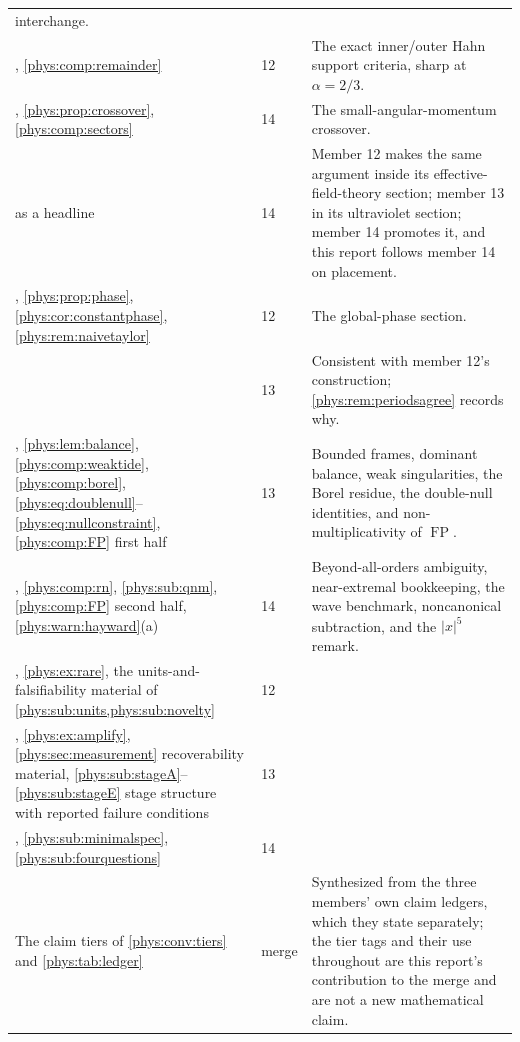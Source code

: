 \documentclass[11pt,letterpaper]{article}
\numberwithin{equation}{section}
\theoremstyle{definition}
\theoremstyle{remark}
\DeclareMathOperator{\FP}{FP}
\newcommand{\abs}[1]{\lvert#1\rvert}
\begin{document}
\begin{longtable}{@{}L{0.30\textwidth}L{0.11\textwidth}L{0.52\textwidth}@{}}
interchange. \\
\addlinespace
{}, \cref{phys:comp:remainder} & 12 & The exact
inner/outer Hahn support criteria, sharp at $\alpha=2/3$. \\
\addlinespace
{}, \cref{phys:prop:crossover},
\cref{phys:comp:sectors} & 14 & The small-angular-momentum crossover. \\
\addlinespace
{} as a headline & 14 & Member 12 makes the same argument
inside its effective-field-theory section; member 13 in its
ultraviolet section; member 14 promotes it, and this report follows member 14
on placement. \\
\addlinespace
{}, \cref{phys:prop:phase},
\cref{phys:cor:constantphase}, \cref{phys:rem:naivetaylor} & 12 &
The global-phase section. \\
\addlinespace
{} & 13 & Consistent with member 12's construction;
\cref{phys:rem:periodsagree} records why. \\
\addlinespace
{}, \cref{phys:lem:balance},
\cref{phys:comp:weaktide}, \cref{phys:comp:borel},
\eqref{phys:eq:doublenull}--\eqref{phys:eq:nullconstraint},
\cref{phys:comp:FP} first half & 13 & Bounded frames, dominant balance, weak
singularities, the Borel residue, the double-null identities, and
non-multiplicativity of $\FP$. \\
\addlinespace
{}, \cref{phys:comp:rn},
\cref{phys:sub:qnm}, \cref{phys:comp:FP} second half,
\cref{phys:warn:hayward}(a) & 14 & Beyond-all-orders ambiguity, near-extremal
bookkeeping, the wave benchmark, noncanonical subtraction, and the
$\abs x^{5}$ remark. \\
\addlinespace
{}, \cref{phys:ex:rare}, the units-and-falsifiability
material of \cref{phys:sub:units,phys:sub:novelty} & 12 & \\
\addlinespace
{}, \cref{phys:ex:amplify},
\cref{phys:sec:measurement} recoverability material,
\cref{phys:sub:stageA}--\cref{phys:sub:stageE} stage structure with reported
failure conditions & 13 & \\
\addlinespace
{}, \cref{phys:sub:minimalspec},
\cref{phys:sub:fourquestions} & 14 & \\
\addlinespace
The claim tiers of \cref{phys:conv:tiers} and
\cref{phys:tab:ledger} & merge & Synthesized from the three members' own claim
ledgers, which they state separately; the tier tags and their use throughout
are this report's contribution to the merge and are not a new mathematical
claim. \\
\end{longtable}
\end{document}
